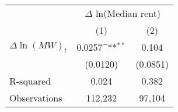{
\def\sym#1{\ifmmode^{#1}\else\(^{#1}\)\fi}
\begin{tabular}{l*{2}{c}}
\hline\hline
          &\multicolumn{2}{c}{$\Delta$ ln(Median rent)}\\\cmidrule(lr){2-3}
          &\multicolumn{1}{c}{(1)}         &\multicolumn{1}{c}{(2)}         \\
\hline
$\Delta \ln(MW)_{t}$&   0.0257\sym{**} &    0.104         \\
          & (0.0120)         & (0.0851)         \\
\hline
R-squared &    0.024         &    0.382         \\
Observations&  112,232         &   97,104         \\
\hline\hline
\end{tabular}
}
